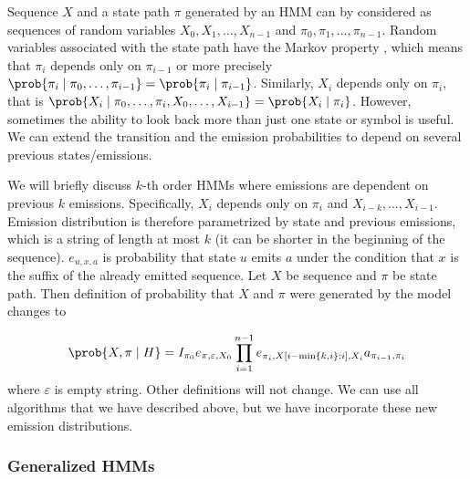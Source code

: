 Sequence $X$ and a state path $\pi$ generated by an HMM can by considered as
sequences of random variables $X_0,X_1,\dots, X_{n-1}$ and
$\pi_0,\pi_1,\dots,\pi_{n-1}$.  Random variables associated with the state path
have the Markov property \cite{Levin2006}, which means that $\pi_i$ depends
only on $\pi_{i-1}$ or more precisely
$\prob{\pi_i\mid\pi_0,\dots,\pi_{i-1}}=\prob{\pi_i\mid\pi_{i-1}}$. Similarly,
$X_i$ depends only on $\pi_i$, that is
$\prob{X_i\mid\pi_0,\dots,\pi_i,X_0,\dots,X_{i-1}}=\prob{X_i\mid\pi_i}$.
However, sometimes the  ability to look back more than just one state or symbol
is useful. We can extend the transition and the emission probabilities to
depend on several previous states/emissions. 

\nocite{Brejova2005,Alexanderson2004}
We will briefly discuss $k$-th order HMMs where emissions are dependent on
previous $k$ emissions. Specifically, $X_i$ depends only on $\pi_i$ and
$X_{i-k},\dots,X_{i-1}$. Emission distribution is therefore parametrized by
state and previous emissions, which is a string of length at most $k$ (it can be
shorter in the beginning of the sequence). $e_{u,x,a}$ is probability that
state $u$ emits $a$ under the condition that $x$ is the suffix of the already emitted
sequence. Let $X$ be sequence and $\pi$ be state path. Then definition
of probability that $X$ and $\pi$ were generated by the model changes to

\[
\prob{X,\pi\mid H} = 
I_{\pi_0}e_{\pi,\varepsilon,X_0}\prod_{i=1}^{n-1}
e_{\pi_i,X[i-\min\{k,i\}:i],X_i}a_{\pi_{i-1},\pi_i}
\]
where $\varepsilon$ is empty string. Other definitions will not change. We can
use all algorithms that we have described above, but we have incorporate these
new emission distributions.

\subsubsection{Generalized HMMs}

